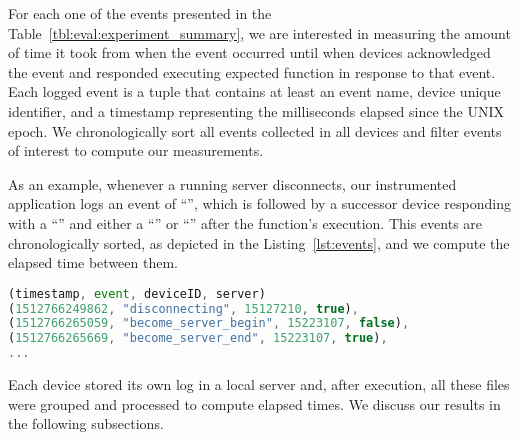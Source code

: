 For each one of the events presented in the Table~\ref{tbl:eval:experiment_summary}, we are interested in measuring the amount of time it took from when the event occurred until when devices acknowledged the event and responded executing expected function in response to that event. 
Each logged event is a tuple that contains at least an event name, device unique identifier, and a timestamp representing the milliseconds elapsed since the UNIX epoch.
We chronologically sort all events collected in all devices and filter events of interest to compute our measurements.


As an example, whenever a running server disconnects, our instrumented application logs an event of ``{}'', which is followed by a successor device responding with a ``{}'' and either a ``{}'' or ``{}'' after the function's execution. This events are chronologically sorted, as depicted in the Listing~\ref{lst:events}, and we compute the elapsed time between them.

\begin{tiny}
\begin{lstlisting}[caption={Tuples with logged events},label={lst:events}, language=JavaScript]
(timestamp, event, deviceID, server)
(1512766249862, "disconnecting", 15127210, true),
(1512766265059, "become_server_begin", 15223107, false),
(1512766265669, "become_server_end", 15223107, true),
...
\end{lstlisting}    
\end{tiny}


Each device stored its own log in a local server and, after execution, all these files were grouped and processed to compute elapsed times. 
We discuss our results in the following subsections.



